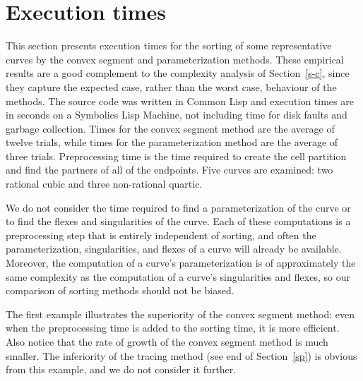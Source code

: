 \section{Execution times}
\label{data}
This section presents execution times for the sorting of some representative
curves by the convex segment and parameterization methods.
These empirical results are a good complement to the complexity analysis 
of Section~\ref{s-c}, since they capture the expected case, rather than 
the worst case, behaviour of the methods.
The source code was written in Common Lisp and
execution times are in seconds on a Symbolics Lisp Machine, 
not including time for disk faults and garbage collection.
Times for the convex segment method are the average of twelve trials, 
while times for the parameterization method are the average of three trials.
Preprocessing time is the time required to create the cell partition 
and find the partners of all of the endpoints.
Five curves are examined: two rational cubic and three non-rational quartic.

We do not consider the time required to find a parameterization of the
curve or to find the flexes and singularities of the curve.
Each of these computations is a preprocessing step that is 
entirely independent of sorting, and often the parameterization, singularities, 
and flexes of a curve will already be available.
Moreover, the computation of a curve's parameterization is of approximately the same
complexity as the computation of a curve's singularities and flexes,
so our comparison of sorting methods should not be biased.

The first example illustrates the superiority of the convex segment method:
even when the preprocessing time is added to the sorting time, it is more efficient.
Also notice that the rate of growth of the convex segment method is much smaller.
The inferiority of the tracing method (see end of Section~\ref{sp})
is obvious from this example, and we do not consider it further.

